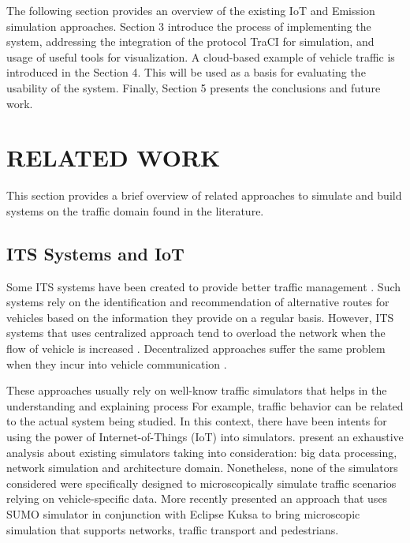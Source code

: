 \documentclass[letter, 10pt, conference]{ieeeconf}
\begin{document}
The following section provides an overview of the existing IoT and Emission simulation approaches.
Section 3 introduce the process of implementing the system, addressing the integration of the protocol TraCI for simulation, and usage of useful tools for visualization.
A cloud-based example of vehicle traffic is introduced in the Section 4. This will be used as a basis for evaluating the usability of the system.
Finally, Section 5 presents the conclusions and future work.

\section{RELATED WORK}

This section provides a brief overview of related approaches to simulate and build systems on the traffic domain found in the literature.

\subsection{ITS Systems and IoT}

Some ITS systems have been created to provide better traffic management \cite{de_souza_real-time_2016} \cite{brennand_intelligent_2015}.
Such systems rely on the identification and recommendation of alternative routes for vehicles based on the information they provide on a regular basis.
However, ITS systems that uses centralized approach tend to overload the network when the flow of vehicle is increased \cite{de_souza_fully-distributed_2016}.
Decentralized approaches suffer the same problem when they incur into vehicle communication \cite{de_souza_fully-distributed_2017}.

These approaches usually rely on well-know traffic simulators that helps in the understanding and explaining process
For example, traffic behavior can be related to the actual system being studied.
In this context, there have been intents for using the power of Internet-of-Things (IoT) into simulators.
\cite{waddell_architecture_2018} present an exhaustive analysis about existing simulators taking into consideration: big data processing, network simulation and architecture domain.
Nonetheless, none of the simulators considered were specifically designed to microscopically simulate traffic scenarios relying on vehicle-specific data.
More recently \cite{hofer_large_2018} presented an approach that uses SUMO simulator in conjunction with Eclipse Kuksa to bring microscopic simulation that supports networks, traffic transport and pedestrians.
\end{document}
